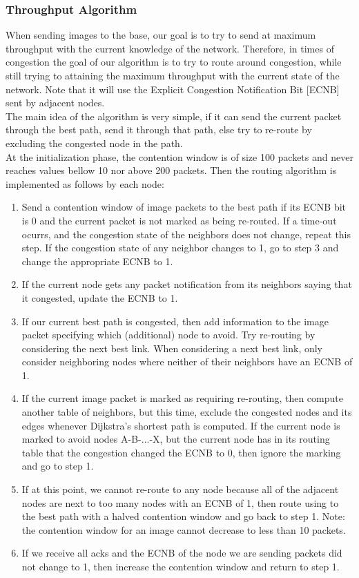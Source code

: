 \documentclass[letterpaper]{article}
\begin{document}
\subsubsection{Throughput Algorithm}


When sending images to the base, our goal is to try to send at maximum throughput with the current knowledge
of the network. Therefore, in times of congestion the goal of our algorithm is to try to route around 
congestion, while still trying to attaining the maximum throughput with the current state of the network. 
Note that it will use the Explicit Congestion Notification Bit [ECNB] sent by adjacent nodes.\\ 

\noindent The main idea of the algorithm is very simple, if it can send the current packet through the best path, send 
it through that path, else try to re-route by excluding the congested node in the path.\\
 

At the initialization phase, the contention window is of size 100 packets and never reaches values bellow 10 nor above 200 packets. Then the routing algorithm is implemented as follows by each node:

\begin{enumerate}

  \item Send a contention window of image packets to the best path if its ECNB bit is 0 and the current packet is not marked as being re-routed. If a time-out ocurrs, and the congestion state of the neighbors does not change, repeat this step. If the congestion state of any neighbor changes to 1, go to step 3 and change the appropriate ECNB to 1.
  \item If the current node gets any packet notification from its neighbors saying that it congested, update the ECNB to 1.
  \item If our current best path is congested, then add information to the image packet specifying which (additional) node to avoid. Try re-routing by considering the next best link. When considering a next best link, only consider neighboring nodes where neither of their neighbors have an ECNB of 1. 
  \item If the current image packet is marked as requiring re-routing, then compute another table of neighbors, but this time, exclude the congested nodes and its edges whenever Dijkstra's shortest path is computed. If the current node is marked to avoid nodes A-B-...-X, but the current node has in its routing table that the congestion changed the ECNB to 0, then ignore the marking and go to step 1.
  \item If at this point, we cannot re-route to any node because all of the adjacent nodes are next to too many nodes with an ECNB of 1, then route using to the best path with a halved contention window and go back to step 1. Note: the contention window for an image cannot decrease to less than 10 packets.
  \item If we receive all acks and the ECNB of the node we are sending packets did not change to 1, then increase the contention window and return to step 1.
\end{enumerate}
\end{document}
